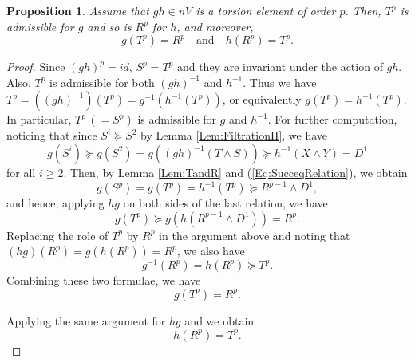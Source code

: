 \documentclass[12pt,reqno]{amsart}
\theoremstyle{plain}
\newtheorem{proposition}[theorem]{Proposition}
\theoremstyle{definition}
\theoremstyle{remark}
\numberwithin{equation}{section}
\begin{document}
\begin{proposition}\label{Prop:TandR}  
	Assume that  $gh \in nV$  is a torsion element of order  $p$.  
	Then,  
	$T^p$  is admissible for  $g$  and so is  $R^p$  for  $h$,  
	and moreover,  
	\begin{equation*} 
		g(T^p) = R^p  \quad \text{and}  \quad  h(R^p) = T^p.   
	\end{equation*} 
\end{proposition} 
\begin{proof} 
	Since  $(gh)^p = id$, 
	$S^p = T^p$  and they are invariant under the action of  $gh$.            
	Also, 
	$T^p$  is admissible for both  $(gh)^{-1}$  and  $h^{-1}$.  
	Thus we have 
	$T^p = ((gh)^{-1})(T^p) = g^{-1}(h^{-1}(T^p))$, 
	or equivalently  $g(T^p) = h^{-1}(T^p)$.  
	In particular, 
	$T^p \, (= S^p)$  is admissible for  $g$  and  $h^{-1}$.  
	For further computation, 
	noticing that since  $S^i \succeq S^2$  by Lemma \ref{Lem:FiltrationII}, 
	we have   
	\begin{equation}\label{Eq:SucceqRelation} 
		g(S^i) \succeq g(S^2) = g((gh)^{-1}(T \wedge S)) \succeq h^{-1} (X \wedge Y) = D^1 
	\end{equation} 
	for all  $i \geq 2$.  
	Then, 
	by Lemma \ref{Lem:TandR} and (\ref{Eq:SucceqRelation}), 
	we obtain 
       	\begin{equation*} 
		g(S^p) = g(T^p) = h^{-1}(T^p) \succeq R^{p-1} \wedge D^1,  
	\end{equation*} 
	and hence, 
	applying  $hg$  on both sides of the last relation, 
	we have 
	\begin{equation*} 
		g(T^p) \succeq g(h(R^{p-1} \wedge D^1)) = R^p. 
	\end{equation*} 
	Replacing the role of  $T^p$  by  $R^p$  in the argument above  
	and noting that  $(hg)(R^p) = g(h(R^p)) = R^p$, 
	we also have 
	\begin{equation*} 
		g^{-1}(R^p) = h(R^p) \succeq T^{p}. 
	\end{equation*} 
	Combining these two formulae, 
	we have 
	\begin{equation*} 
		g(T^p)= R^p. 
	\end{equation*} 
	
	Applying the same argument for  $hg$  and we obtain   
	\begin{equation*} 
		h(R^p)= T^p. 
	\end{equation*} 
\end{proof} 
\end{document}
